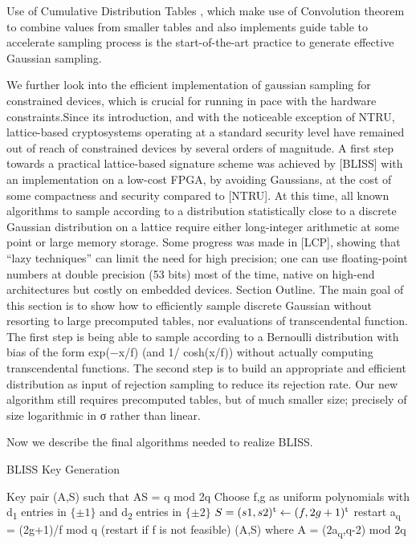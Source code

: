 \documentclass[conference]{IEEEtran}
\begin{document}
Use of Cumulative Distribution Tables , which make use of Convolution theorem to combine values from smaller tables and also implements guide table to accelerate sampling process is the start-of-the-art practice to generate effective Gaussian sampling.

We  further look into the efficient implementation of gaussian sampling for constrained devices, which is crucial for running
in pace with the hardware constraints.Since its introduction, and with the noticeable exception of NTRU, lattice-based cryptosystems
operating at a standard security level have remained out of reach of constrained devices by several
orders of magnitude. A first step towards a practical lattice-based signature scheme was achieved
by [BLISS] with an implementation on a low-cost FPGA, by avoiding Gaussians, at the cost of
some compactness and security compared to [NTRU].
At this time, all known algorithms to sample according to a distribution statistically close to a
discrete Gaussian distribution on a lattice  require either long-integer arithmetic 
at some point or large memory storage. Some progress was made in [LCP], showing
that “lazy techniques” can limit the need for high precision; one can use floating-point numbers at
double precision (53 bits) most of the time, native on high-end architectures but costly on embedded
devices.
Section Outline. The main goal of this section is to show how to efficiently sample discrete Gaussian
without resorting to large precomputed tables, nor evaluations of transcendental function. The first
step is being able to sample according to a Bernoulli distribution with bias of the form exp(−x/f)
(and 1/ cosh(x/f)) without actually computing transcendental functions. The second
step is to build an appropriate and efficient distribution as input of rejection
sampling to reduce its rejection rate. Our new algorithm still requires precomputed
tables, but of much smaller size; precisely of size logarithmic in σ rather than linear.


Now we describe the final algorithms needed to realize BLISS.

\begin{algorithm}
        \caption{BLISS Key Generation}
        \begin{algorithmic}
            \STATE Key pair (A,S) such that AS = q mod 2q
            \STATE Choose f,g as uniform polynomials with d\textsubscript{1} entries in  $\{\pm1\}$ and d\textsubscript{2} entries in  $\{\pm2\}$
            \STATE $ S = (s1,s2)\textsuperscript{t} \leftarrow (f,2g+1)\textsuperscript{t} $
            \STATE restart
            \ENDIF
            \STATE a\textsubscript{q} = (2g+1)/f mod q (restart if f is not feasible)
            \RETURN (A,S) where A = (2a\textsubscript{q},q-2) mod 2q
        \end{algorithmic}
\end{algorithm}
\end{document}

